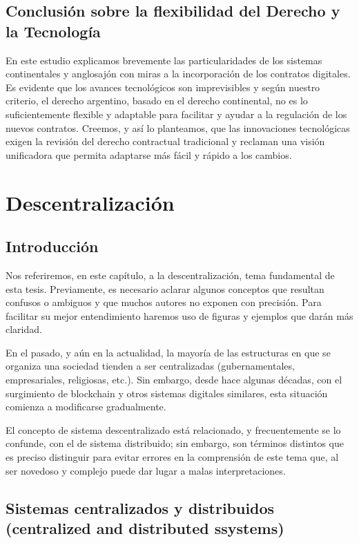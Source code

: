\documentclass[12pt]{report} %
\begin{document}
\begin{itemize}
\section{Conclusión sobre la flexibilidad del Derecho y la Tecnología}

En este estudio explicamos brevemente las particularidades de los sistemas continentales y anglosajón con miras a la incorporación de los contratos digitales. Es evidente que los avances tecnológicos son imprevisibles  y según nuestro criterio, el derecho argentino, basado en el derecho continental, no es lo suficientemente  flexible y adaptable para facilitar y ayudar a la regulación de los nuevos contratos. Creemos, y así lo planteamos, que las innovaciones tecnológicas exigen la revisión del derecho contractual tradicional y reclaman una visión unificadora que permita adaptarse más fácil y rápido a los cambios.


\chapter{Descentralización}
\label{Descentralización}


\section{Introducción}

Nos referiremos, en este capítulo, a la descentralización, tema fundamental de esta tesis. Previamente, es necesario aclarar algunos conceptos que resultan confusos o ambiguos y que muchos autores no exponen con precisión. Para facilitar su mejor entendimiento haremos uso de figuras y ejemplos que darán más claridad.

En el pasado, y aún en la actualidad, la mayoría de las estructuras en que se organiza una sociedad tienden a ser centralizadas (gubernamentales, empresariales, religiosas, etc.). Sin embargo, desde hace algunas décadas, con el surgimiento de blockchain y otros sistemas digitales similares, esta situación comienza a modificarse gradualmente.

El concepto de sistema descentralizado está relacionado, y frecuentemente se lo confunde, con el de sistema distribuido; sin embargo, son términos distintos que es preciso distinguir para evitar errores en la comprensión de este tema que, al ser novedoso y complejo puede dar lugar a malas interpretaciones.  

\section{Sistemas centralizados y distribuidos (centralized and distributed ssystems)} 
\label{Sistemas centralizados y distribuidos}


\end{itemize}
\end{document}
